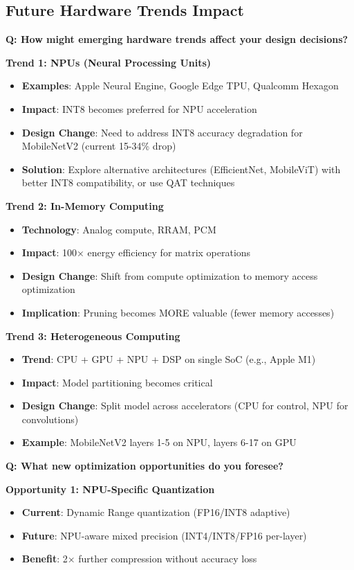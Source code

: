 \documentclass[10pt, a4paper]{article}
\begin{document}
\subsection{Future Hardware Trends Impact}

\textbf{Q: How might emerging hardware trends affect your design decisions?}

\textbf{Trend 1: NPUs (Neural Processing Units)}
\begin{itemize}
    \item \textbf{Examples}: Apple Neural Engine, Google Edge TPU, Qualcomm Hexagon
    \item \textbf{Impact}: INT8 becomes preferred for NPU acceleration
    \item \textbf{Design Change}: Need to address INT8 accuracy degradation for MobileNetV2 (current 15-34\% drop)
    \item \textbf{Solution}: Explore alternative architectures (EfficientNet, MobileViT) with better INT8 compatibility, or use QAT techniques
\end{itemize}

\textbf{Trend 2: In-Memory Computing}
\begin{itemize}
    \item \textbf{Technology}: Analog compute, RRAM, PCM
    \item \textbf{Impact}: 100× energy efficiency for matrix operations
    \item \textbf{Design Change}: Shift from compute optimization to memory access optimization
    \item \textbf{Implication}: Pruning becomes MORE valuable (fewer memory accesses)
\end{itemize}

\textbf{Trend 3: Heterogeneous Computing}
\begin{itemize}
    \item \textbf{Trend}: CPU + GPU + NPU + DSP on single SoC (e.g., Apple M1)
    \item \textbf{Impact}: Model partitioning becomes critical
    \item \textbf{Design Change}: Split model across accelerators (CPU for control, NPU for convolutions)
    \item \textbf{Example}: MobileNetV2 layers 1-5 on NPU, layers 6-17 on GPU
\end{itemize}

\textbf{Q: What new optimization opportunities do you foresee?}

\textbf{Opportunity 1: NPU-Specific Quantization}
\begin{itemize}
    \item \textbf{Current}: Dynamic Range quantization (FP16/INT8 adaptive)
    \item \textbf{Future}: NPU-aware mixed precision (INT4/INT8/FP16 per-layer)
    \item \textbf{Benefit}: 2× further compression without accuracy loss
\end{itemize}
\end{document}
